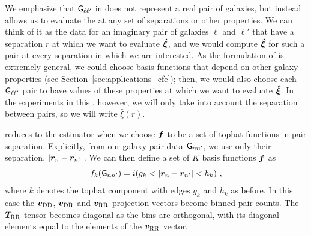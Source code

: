 We emphasize that $\mathsf{G}_{\ell \ell'}$ in  does not represent a real pair of galaxies, but instead allows us to evaluate the \cf at any set of separations or other properties.
We can think of it as the data for an imaginary pair of galaxies $\ell$ and $\ell'$ that have a separation $r$ at which we want to evaluate $\bm{\hat{\xi}}$, and we would compute $\bm{\hat{\xi}}$ for such a pair at every separation in which we are interested.
As the formulation of \est is extremely general, we could choose basis functions that depend on other galaxy properties (see Section~\ref{sec:applications_cfe}); then, we would also choose each $\mathsf{G}_{\ell \ell'}$ pair to have values of these properties at which we want to evaluate $\bm{\hat{\xi}}$.
In the experiments in this \documentname, however, we will only take into account the separation between pairs, so we will write $\hat{\xi}(r)$.

\Est reduces to the \LS estimator when we choose $\bm{f}$ to be a set of tophat functions in pair separation.
Explicitly, from our galaxy pair data $\mathsf{G}_{n n'}$, we use only their separation,  $|\bm{r}_n - \bm{r}_{n'}|$.
We can then define a set of $K$ basis functions $\bm{f}$ as
\begin{equation}
    \label{eq:ff_separation}
    f_k(\mathsf{G}_{n n'}) =  i(g_k < |\bm{r}_n - \bm{r}_{n'}| < h_k) ~,
\end{equation}
where $k$ denotes the tophat component with edges $g_k$ and $h_k$ as before.
In this case the $\bm{v}_\mathrm{DD}$, $\bm{v}_\mathrm{DR}$ and $\bm{v}_\mathrm{RR}$ projection vectors become binned pair counts.
The $\bm{T}_\mathrm{RR}$ tensor becomes diagonal as the bins are orthogonal, with its diagonal elements equal to the elements of the $\bm{v}_\mathrm{RR}$ vector.


